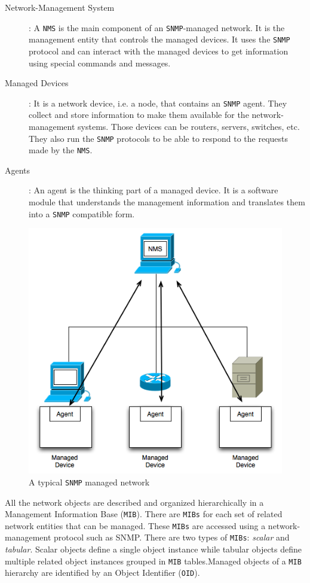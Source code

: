 \begin{description}
	\item [Network-Management System]: A \texttt{NMS} is the main component of an \texttt{SNMP}-managed network. It is the management entity that controls the managed devices. It uses the \texttt{SNMP} protocol and can interact with the managed devices to get information using special commands and messages.
	
	\item [Managed Devices]: It is a network device, i.e. a node, that contains an \texttt{SNMP} agent. They collect and store information to make them available for the network-management systems. Those devices can be routers, servers, switches, etc. They also run the \texttt{SNMP} protocols to be able to respond to the requests made by the \texttt{NMS}.
	
	\item [Agents]: An agent is the thinking part of a managed device. It is a software module that understands the management information and translates them into a \texttt{SNMP} compatible form.
\end{description}

\begin{figure}[H]
\centering
	\includegraphics[width=.5\linewidth]{Pictures/chapter2/snmp.png}
	\caption{A typical \texttt{SNMP} managed network}
\end{figure}

All the network objects are described and organized hierarchically in a Management Information Base (\texttt{MIB}). There are \texttt{MIBs} for each set of related network entities that can be managed. These \texttt{MIBs} are accessed using a network-management protocol such as SNMP. There are two types of \texttt{MIBs}: \textit{scalar} and \textit{tabular}. Scalar objects define a single object instance while tabular objects define multiple related object instances grouped in \texttt{MIB} tables.Managed objects of a \texttt{MIB} hierarchy are identified by an Object Identifier (\texttt{OID}).




